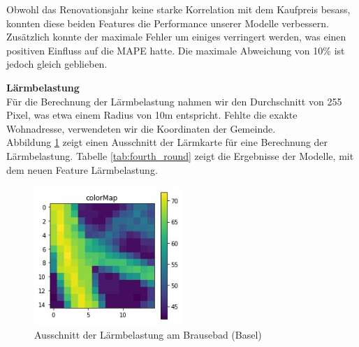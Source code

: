 \begin{table}[ht]
\centering
{}
\caption{Ergebnisse mit Einbezug der Renovation}
\label{tab:third_round}
\end{table}

Obwohl das Renovationsjahr keine starke Korrelation mit dem Kaufpreis besass, konnten diese beiden Features die Performance unserer Modelle verbessern. Zusätzlich konnte der maximale Fehler um einiges verringert werden, was einen positiven Einfluss auf die MAPE hatte. Die maximale Abweichung von 10\% ist jedoch gleich geblieben.

\textbf{Lärmbelastung}\\
Für die Berechnung der Lärmbelastung nahmen wir den Durchschnitt von 255 Pixel, was etwa einem Radius von 10m entspricht. Fehlte die exakte Wohnadresse, verwendeten wir die Koordinaten der Gemeinde.\\
Abbildung \ref{fig:noise} zeigt einen Ausschnitt der Lärmkarte für eine Berechnung der Lärmbelastung. Tabelle \ref{tab:fourth_round} zeigt die Ergebnisse der Modelle, mit dem neuen Feature Lärmbelastung.

\begin{figure}[ht]
\centering
\includegraphics[width=0.5\textwidth]{images/noise.jpeg}
\caption[Ausschnitt der Lärmbelastung am Brausebad (Basel)]{Ausschnitt der Lärmbelastung am Brausebad (Basel)}
\label{fig:noise}
\end{figure}

